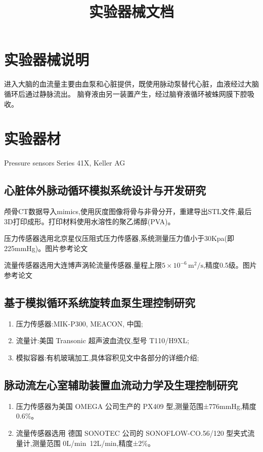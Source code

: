 \documentclass[titlepage,12pt]{article}
\title{实验器械文档}
\begin{document}
\maketitle

\section{实验器械说明}
进入大脑的血流量主要由血泵和心脏提供，既使用脉动泵替代心脏，血液经过大脑循环后通过静脉流出。
脑脊液由另一装置产生，经过脑脊液循环被蛛网膜下腔吸收。

\section{实验器材}

Pressure sensors Series 41X, Keller AG

\subsection{心脏体外脉动循环模拟系统设计与开发研究}
颅骨CT数据导入mimics,使用灰度图像将骨与非骨分开，重建导出STL文件,最后3D打印成形。打印材料使用水溶性的聚乙烯醇(PVA)。

压力传感器选用北京星仪压阻式压力传感器,系统测量压力值小于30Kpa(即225mmHg)。图片参考论文

流量传感器选用大连博声涡轮流量传感器,量程上限$5\times10^{-6} \, \text{m}^2/\text{s}$,精度0.5级。图片参考论文
\subsection{基于模拟循环系统旋转血泵生理控制研究}
\begin{enumerate}
    \item 压力传感器:MIK-P300, MEACON, 中国;
    \item 流量计:美国 Transonic 超声波血流仪,型号 T110/H9XL;
    \item 模拟容器:有机玻璃加工,具体容积见文中各部分的详细介绍;
\end{enumerate}

\subsection{脉动流左心室辅助装置血流动力学及生理控制研究}
\begin{enumerate}
    \item 压力传感器为美国 OMEGA 公司生产的  PX409 型,测量范围±776mmHg,精度 0.6\%。
    \item 流量传感器选用  德国 SONOTEC 公司的 SONOFLOW-CO.56/120 型夹式流量计,测量范围 0L/min~12L/min,精度±2\%。
\end{enumerate}
\end{document}
